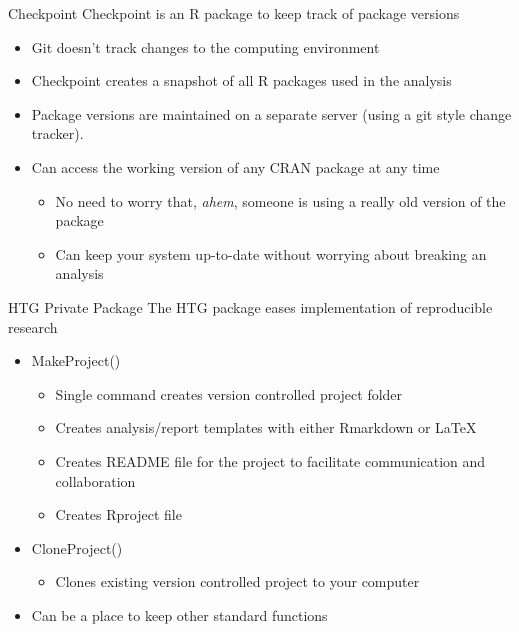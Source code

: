 \documentclass{beamer}\usepackage[]{graphicx}\usepackage[]{color}
\begin{document}
\begin{frame}{Checkpoint}
Checkpoint is an R package to keep track of package versions
\bigskip
\begin{itemize}
\item Git doesn't track changes to the computing environment
\pause
\item Checkpoint creates a snapshot of all R packages used in the analysis
\pause
\item Package versions are maintained on a separate server (using a git style change tracker).
\pause
\item Can access the working version of any CRAN package at any time
  \begin{itemize}
  \item No need to worry that, \emph{ahem}, someone is using a really old version of the package
  \item Can keep your system up-to-date without worrying about breaking an analysis
  \end{itemize}

\end{itemize}
\end{frame}

\begin{frame}{HTG Private Package}
The HTG package eases implementation of reproducible research
\bigskip
\begin{itemize}
\item MakeProject()
  \begin{itemize}
  \item Single command creates version controlled project folder
  \item Creates analysis/report templates with either Rmarkdown or \LaTeX
  \item Creates README file for the project to facilitate communication and collaboration
  \item Creates Rproject file
  \end{itemize}
  \pause
\item CloneProject()
  \begin{itemize}
  \item Clones existing version controlled project to your computer
  \end{itemize}
  \pause
\item Can be a place to keep other standard functions 
\end{itemize}
\end{frame}
\end{document}
